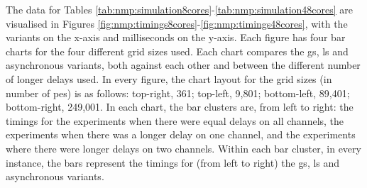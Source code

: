 The data for Tables \ref{tab:nmp:simulation8cores}-\ref{tab:nmp:simulation48cores} are visualised in Figures \ref{fig:nmp:timings8cores}-\ref{fig:nmp:timings48cores}, with the variants on the x-axis and milliseconds on the y-axis.  Each figure has four bar charts for the four different grid sizes used.  Each chart compares the \gls{gs}, \gls{ls} and asynchronous variants, both against each other and between the different number of longer delays used.  In every figure, the chart layout for the grid sizes (in number of \glspl{pe}) is as follows:  top-right, 361;  top-left, 9,801;  bottom-left, 89,401;  bottom-right, 249,001.  In each chart, the bar clusters are, from left to right:  the timings for the experiments when there were equal delays on all channels, the experiments when there was a longer delay on one channel, and the experiments where there were longer delays on two channels.  Within each bar cluster, in every instance, the bars represent the timings for (from left to right) the \gls{gs}, \gls{ls} and asynchronous variants.

